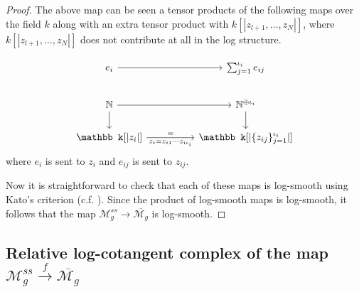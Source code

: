 \documentclass[11pt]{amsart}
\theoremstyle{plain}
\numberwithin{equation}{section}
\theoremstyle{definition}
\theoremstyle{plain}
\begin{document}
\begin{proof}
The above map can be seen a tensor products of the following maps over the field $k$ along with an extra tensor product with $k[|z_{l+1}, \dots, z_N|]$, where  $k[|z_{l+1}, \dots, z_N|]$ does not contribute at all in the log structure. 

\begin{equation}
\begin{tikzcd}
& e_i\arrow{rr} && \sum^{\iota_i}_{j=1} e_{ij}\\
& \mathbb N\arrow{d}\arrow{rr} && \mathbb N^{\oplus \iota_i}\arrow{d} & 
\\
& \mathbb k[|z_i|] \arrow["="]{rr}[swap]{z_i=z_{i1}\cdots z_{i\iota_i} } && \mathbb k[|\{z_{ij}\}^{\iota_i}_{j=1}|] & 
\end{tikzcd}
\end{equation}
where $e_i$ is sent to $z_i$ and $e_{ij}$ is sent to $z_{ij}$.

Now it is straightforward to check that each of these maps is log-smooth using Kato's criterion (c.f. \cite[Theorem 3.5]{17b}). Since the product of log-smooth maps is log-smooth, it follows that the map $\mathcal M^{ss}_g\longrightarrow \overline{\mathcal M_g}$ is log-smooth. 
\end{proof}

\subsection{\textbf{Relative log-cotangent complex of the map \texorpdfstring{${\mathcal M^{ss}_g}\stackrel{f}\longrightarrow \overline{\mathcal M_g}$}{MssgtoMg}}}
\end{document}
